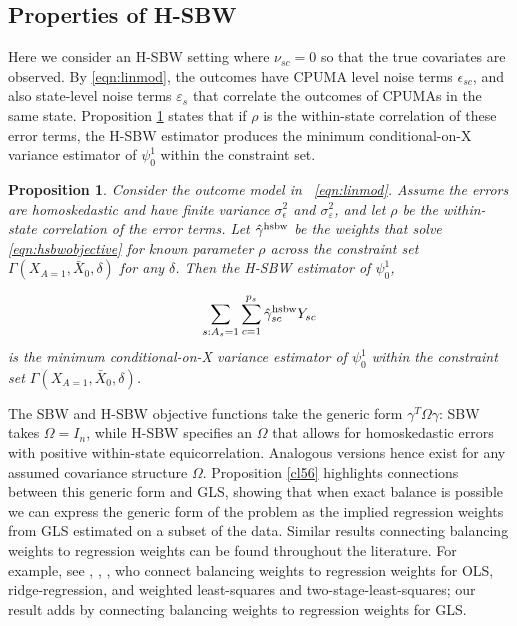 \documentclass[aoas]{imsart}
\theoremstyle{plain}
\newtheorem{proposition}{Proposition}
\theoremstyle{remark}
\begin{document}
\begin{appendix}
\subsection{Properties of H-SBW}\label{app:AsecII}

Here we consider an H-SBW setting where $\nu_{sc}=0$ so that the true covariates are observed. By \eqref{eqn:linmod}, the outcomes have CPUMA level noise terms  $\epsilon_{sc}$, and also state-level noise terms $\varepsilon_s$ that correlate the outcomes of CPUMAs in the same state. Proposition \ref{cl4} states that if $\rho$ is the within-state correlation of these error terms, the H-SBW estimator produces the minimum conditional-on-X variance estimator of $\psi_0^1$ within the constraint set.

\begin{proposition}\label{cl4}
    Consider the outcome model in ~\eqref{eqn:linmod}. Assume the errors are homoskedastic and have finite variance $\sigma^2_{\epsilon}$ and $\sigma^2_{\varepsilon}$, and let $\rho$ be the within-state correlation of the error terms. Let $\hat{\gamma}^{\textup{hsbw}}$ be the weights that solve \eqref{eqn:hsbwobjective} for known parameter $\rho$ across the constraint set $\Gamma(X_{A=1}, \bar{X}_0, \delta)$ for any $\delta$. Then the H-SBW estimator of $\psi_0^1$,

    \[\sum_{s: A_s = 1}\sum_{c=1}^{p_s}\hat{\gamma}_{sc}^{\textup{hsbw}}Y_{sc}\] 
    is the minimum conditional-on-X variance estimator of $\psi_0^1$ within the constraint set $\Gamma(X_{A=1}, \bar{X}_0, \delta)$.
\end{proposition}

The SBW and H-SBW objective functions take the generic form $\gamma^T\Omega\gamma$: SBW takes $\Omega = I_n$, while H-SBW specifies an $\Omega$ that allows for homoskedastic errors with positive within-state equicorrelation. Analogous versions hence exist for any assumed covariance structure $\Omega$. Proposition \ref{cl56} highlights connections between this generic form and GLS, showing that when exact balance is possible we can express the generic form of the problem as the implied regression weights from GLS estimated on a subset of the data. Similar results connecting balancing weights to regression weights can be found throughout the literature. For example, see \cite{kline2011oaxaca}, \cite{ben2021augmented}, \cite{chattopadhyay2021implied}, who connect balancing weights to regression weights for OLS, ridge-regression, and weighted least-squares and two-stage-least-squares; our result adds by connecting balancing weights to regression weights for GLS.


\end{appendix}
\end{document}
